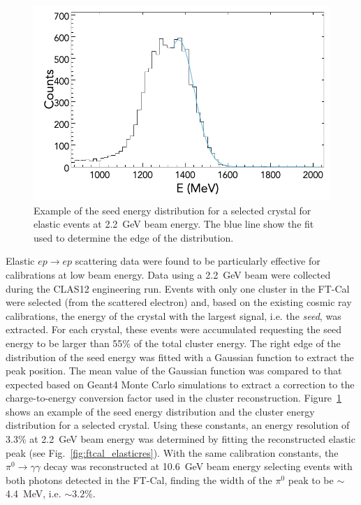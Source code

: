 \begin{figure}
\includegraphics[width=0.9\columnwidth]{fig/ftcal_elastic_seed.png}
\caption{Example of the seed energy distribution for a selected crystal for
  elastic events at 2.2~GeV beam energy. The blue line show the fit used to determine the edge of the distribution.}
\label{fig:ftcal_elasticcal}
\end{figure}

Elastic $ep \to ep$ scattering data were found to be particularly effective for calibrations at low beam energy.
Data using a 2.2~GeV beam were collected during the CLAS12 engineering run. Events with only one cluster in the FT-Cal
were selected (from the scattered electron) and, based on the existing cosmic ray calibrations, the energy of the
crystal with the largest signal, i.e. the {\it seed}, was extracted. For each crystal, these events were accumulated
requesting the seed energy to be larger than 55\% of the total cluster energy. The right edge of the distribution of
the seed energy was fitted with a Gaussian function to extract the peak position. The mean value of the Gaussian
function was compared to that expected based on Geant4 Monte Carlo simulations to extract a correction to the
charge-to-energy conversion factor used in the cluster reconstruction. Figure~\ref{fig:ftcal_elasticcal} shows an
example of the seed energy distribution and the cluster energy distribution for a selected crystal. Using these
constants, an energy resolution of 3.3\% at 2.2~GeV beam energy was determined by fitting the reconstructed
elastic peak (see Fig.~\ref{fig:ftcal_elasticres}). With the same calibration constants, the $\pi^0\to\gamma\gamma$
decay was reconstructed at 10.6~GeV beam energy selecting events with both photons detected in the FT-Cal, finding
the width of the $\pi^0$ peak to be $\sim$4.4~MeV, i.e. $\sim 3.2\%$.

